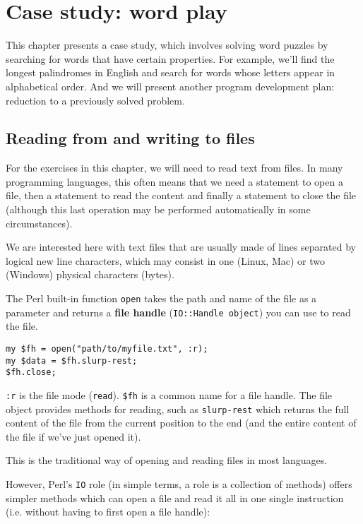 
\chapter{Case study: word play}
\label{wordplay}

This chapter presents a case study, which involves
solving word puzzles by searching for words that have certain
properties.  For example, we'll find the longest palindromes
in English and search for words whose letters appear in
alphabetical order.  And we will present another program 
development plan: reduction to a previously solved problem.


\section{Reading from and writing to files}

For the exercises in this chapter, we will need to read 
text from files. In many programming languages, this often 
means that we need a statement to open a file, then a statement 
to read the content and finally a statement to close the file 
(although this last operation may be performed automatically 
in some circumstances).

We are interested here with text files that are usually 
made of lines separated by logical new line characters,
which may consist in one (Linux, Mac) or two (Windows) 
physical characters (bytes). 

The Perl built-in function {\tt open} takes the path and 
name of the file as a parameter and returns a {\bf file 
handle} ({\tt IO::Handle object}) you can use to read the file.

\begin{verbatim}
my $fh = open("path/to/myfile.txt", :r);
my $data = $fh.slurp-rest;
$fh.close;
\end{verbatim}
%
{\tt :r} is the file mode ({\tt read}). {\tt \$fh} is a common 
name for a file handle.  The file object provides methods 
for reading, such as {\tt slurp-rest} which returns the 
full content of the file from the current position to the 
end (and the entire content of the file if we've just 
opened it).

This is the traditional way of opening and reading files 
in most languages.

However, Perl's {\tt IO} role (in simple terms, a role is 
a collection of methods) offers simpler methods which 
can open a file and read it all in one single instruction (i.e. 
without having to first open a file handle):

